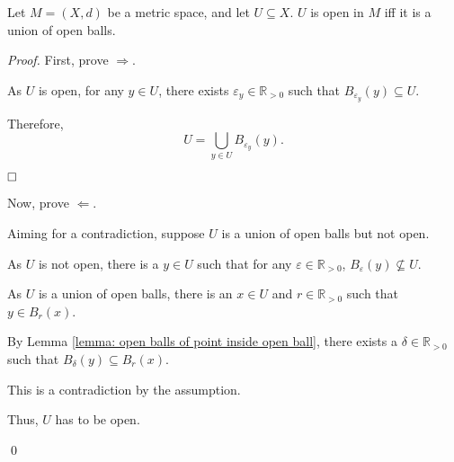 \begin{theorem}
	\label{theorem: set is open iff union of open balls}
	Let $M = (X, d)$ be a metric space, and let $U \subseteq X$. $U$ is open in $M$ iff it is a union of open balls.
	
	\begin{proof}
		First, prove $\Rightarrow$.
		
		As $U$ is open, for any $y \in U$, there exists $\varepsilon_y \in \mathbb R_{> 0}$ such that $B_{\varepsilon_y}(y) \subseteq U$.
		
		Therefore,
		$$
		U = \bigcup_{y \in U} B_{\varepsilon_y} (y).
		$$
		
		$\qedlemma$
		
		Now, prove $\Leftarrow$.
		
		Aiming for a contradiction, suppose $U$ is a union of open balls but not open.
		
		As $U$ is not open, there is a $y \in U$ such that for any $\varepsilon \in \mathbb R_{> 0}$, $B_\varepsilon (y) \not \subseteq U$.
		
		As $U$ is a union of open balls, there is an $x \in U$ and $r \in \mathbb R_{> 0}$ such that $y \in B_r (x)$.
		
		By Lemma \ref{lemma: open balls of point inside open ball}, there exists a $\delta \in \mathbb R_{> 0}$ such that $B_\delta (y) \subseteq B_r (x)$.
		
		This is a contradiction by the assumption.
		
		Thus, $U$ has to be open.
		
		\qed
	\end{proof}
\end{theorem}


